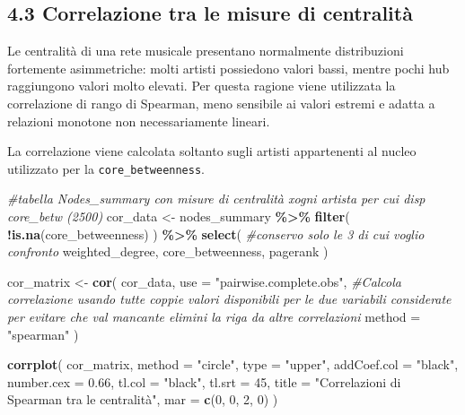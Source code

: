 \documentclass[
]{article}
\newenvironment{Shaded}{\begin{snugshade}}{\end{snugshade}}
\newcommand{\AttributeTok}[1]{\textcolor[rgb]{0.13,0.29,0.53}{#1}}
\newcommand{\CommentTok}[1]{\textcolor[rgb]{0.56,0.35,0.01}{\textit{#1}}}
\newcommand{\DecValTok}[1]{\textcolor[rgb]{0.00,0.00,0.81}{#1}}
\newcommand{\FloatTok}[1]{\textcolor[rgb]{0.00,0.00,0.81}{#1}}
\newcommand{\FunctionTok}[1]{\textcolor[rgb]{0.13,0.29,0.53}{\textbf{#1}}}
\newcommand{\NormalTok}[1]{#1}
\newcommand{\OtherTok}[1]{\textcolor[rgb]{0.56,0.35,0.01}{#1}}
\newcommand{\SpecialCharTok}[1]{\textcolor[rgb]{0.81,0.36,0.00}{\textbf{#1}}}
\newcommand{\StringTok}[1]{\textcolor[rgb]{0.31,0.60,0.02}{#1}}
\begin{document}
\subsection{4.3 Correlazione tra le misure di
centralità}\label{correlazione-tra-le-misure-di-centralituxe0}

Le centralità di una rete musicale presentano normalmente distribuzioni
fortemente asimmetriche: molti artisti possiedono valori bassi, mentre
pochi hub raggiungono valori molto elevati. Per questa ragione viene
utilizzata la correlazione di rango di Spearman, meno sensibile ai
valori estremi e adatta a relazioni monotone non necessariamente
lineari.

La correlazione viene calcolata soltanto sugli artisti appartenenti al
nucleo utilizzato per la \texttt{core\_betweenness}.

\begin{Shaded}
\begin{Highlighting}[]
\CommentTok{\#tabella Nodes\_summary con misure di centralità xogni artista per cui disp core\_betw (2500)}
\NormalTok{cor\_data }\OtherTok{\textless{}{-}}\NormalTok{ nodes\_summary }\SpecialCharTok{\%\textgreater{}\%}
  \FunctionTok{filter}\NormalTok{(}
    \SpecialCharTok{!}\FunctionTok{is.na}\NormalTok{(core\_betweenness)}
\NormalTok{  ) }\SpecialCharTok{\%\textgreater{}\%}
  \FunctionTok{select}\NormalTok{( }\CommentTok{\#conservo solo le 3 di cui voglio confronto}
\NormalTok{    weighted\_degree,}
\NormalTok{    core\_betweenness,}
\NormalTok{    pagerank}
\NormalTok{  )}

\NormalTok{cor\_matrix }\OtherTok{\textless{}{-}} \FunctionTok{cor}\NormalTok{(}
\NormalTok{  cor\_data,}
  \AttributeTok{use =} \StringTok{"pairwise.complete.obs"}\NormalTok{, }\CommentTok{\#Calcola correlazione usando tutte coppie valori disponibili per le due variabili considerate per evitare che val mancante elimini la riga da altre correlazioni}
  \AttributeTok{method =} \StringTok{"spearman"}
\NormalTok{)}

\FunctionTok{corrplot}\NormalTok{(}
\NormalTok{  cor\_matrix,}
  \AttributeTok{method =} \StringTok{"circle"}\NormalTok{,}
  \AttributeTok{type =} \StringTok{"upper"}\NormalTok{,}
  \AttributeTok{addCoef.col =} \StringTok{"black"}\NormalTok{,}
  \AttributeTok{number.cex =} \FloatTok{0.66}\NormalTok{,}
  \AttributeTok{tl.col =} \StringTok{"black"}\NormalTok{,}
  \AttributeTok{tl.srt =} \DecValTok{45}\NormalTok{,}
  \AttributeTok{title =} \StringTok{"Correlazioni di Spearman tra le centralità"}\NormalTok{,}
  \AttributeTok{mar =} \FunctionTok{c}\NormalTok{(}\DecValTok{0}\NormalTok{, }\DecValTok{0}\NormalTok{, }\DecValTok{2}\NormalTok{, }\DecValTok{0}\NormalTok{)}
\NormalTok{)}
\end{Highlighting}
\end{Shaded}
\end{document}
